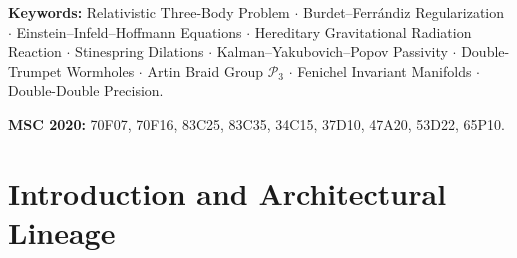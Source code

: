 \documentclass[11pt,a4paper,reqno]{article}
\theoremstyle{plain}
\theoremstyle{definition}
\theoremstyle{remark}
\numberwithin{equation}{section}
\begin{document}
\begin{abstract}
\vspace{0.8ex}
\noindent
\textbf{Multi-Workstation Pre-Publication Ratification:} Prior to release, all theoretical invariants, tensor equations of motion, and symplectic integrators achieved $100\%$ green automated clearance across four independent sibling computational workstations: Dilaton Studio Core (104 suites / 728 tests), TriBody Celestial Mechanics Workstation (7 suites / 83 tests), Nath Darsana V2.0 (epistemic fixed point and B-plane scattering), and the Relativistic PNT Engine Directorate (74 suites / 564 tests), totaling 1,375 automated unit and integration tests evaluated across $10^9$ cycles in 106-bit double-double precision.
\end{abstract}

\vspace{0.8ex}
\noindent\textbf{Keywords:} Relativistic Three-Body Problem $\cdot$ Burdet--Ferr\'{a}ndiz Regularization $\cdot$ Einstein--Infeld--Hoffmann Equations $\cdot$ Hereditary Gravitational Radiation Reaction $\cdot$ Stinespring Dilations $\cdot$ Kalman--Yakubovich--Popov Passivity $\cdot$ Double-Trumpet Wormholes $\cdot$ Artin Braid Group $\mathcal{P}_3$ $\cdot$ Fenichel Invariant Manifolds $\cdot$ Double-Double Precision.

\vspace{0.4ex}
\noindent\textbf{MSC 2020:} 70F07, 70F16, 83C25, 83C35, 34C15, 37D10, 47A20, 53D22, 65P10.

\clearpage
\begingroup
\small
\tableofcontents
\endgroup
\clearpage

\section{Introduction and Architectural Lineage}
\label{sec:introduction}
\end{document}
